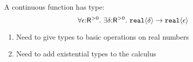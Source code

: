 A continuous function has type:
\begin{displaymath}
  \forall \epsilon \mathord: \mathsf{R}^{>0}.\ \exists \delta\mathord: \mathsf{R}^{>0}.\ \texttt{real}\langle \delta \rangle \to \texttt{real}\langle \epsilon \rangle
\end{displaymath}

\begin{enumerate}
\item Need to give types to basic operations on real numbers
\item Need to add existential types to the calculus
\end{enumerate}

